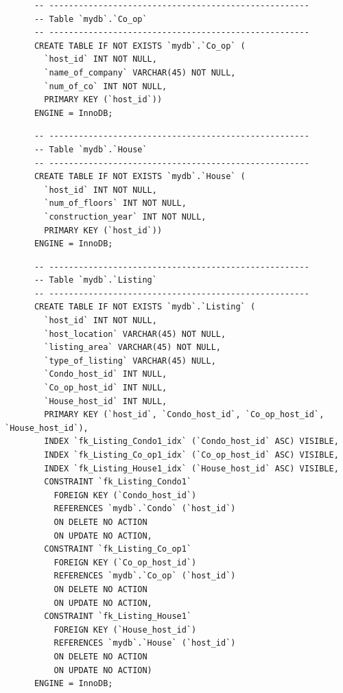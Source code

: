 \documentclass{report}
\begin{document}
    \begin{lstlisting}
      -- -----------------------------------------------------
      -- Table `mydb`.`Co_op`
      -- -----------------------------------------------------
      CREATE TABLE IF NOT EXISTS `mydb`.`Co_op` (
        `host_id` INT NOT NULL,
        `name_of_company` VARCHAR(45) NOT NULL,
        `num_of_co` INT NOT NULL,
        PRIMARY KEY (`host_id`))
      ENGINE = InnoDB;
    \end{lstlisting}


    \begin{lstlisting}
      -- -----------------------------------------------------
      -- Table `mydb`.`House`
      -- -----------------------------------------------------
      CREATE TABLE IF NOT EXISTS `mydb`.`House` (
        `host_id` INT NOT NULL,
        `num_of_floors` INT NOT NULL,
        `construction_year` INT NOT NULL,
        PRIMARY KEY (`host_id`))
      ENGINE = InnoDB;
    \end{lstlisting}


    \begin{lstlisting}
      -- -----------------------------------------------------
      -- Table `mydb`.`Listing`
      -- -----------------------------------------------------
      CREATE TABLE IF NOT EXISTS `mydb`.`Listing` (
        `host_id` INT NOT NULL,
        `host_location` VARCHAR(45) NOT NULL,
        `listing_area` VARCHAR(45) NOT NULL,
        `type_of_listing` VARCHAR(45) NULL,
        `Condo_host_id` INT NULL,
        `Co_op_host_id` INT NULL,
        `House_host_id` INT NULL,
        PRIMARY KEY (`host_id`, `Condo_host_id`, `Co_op_host_id`, `House_host_id`),
        INDEX `fk_Listing_Condo1_idx` (`Condo_host_id` ASC) VISIBLE,
        INDEX `fk_Listing_Co_op1_idx` (`Co_op_host_id` ASC) VISIBLE,
        INDEX `fk_Listing_House1_idx` (`House_host_id` ASC) VISIBLE,
        CONSTRAINT `fk_Listing_Condo1`
          FOREIGN KEY (`Condo_host_id`)
          REFERENCES `mydb`.`Condo` (`host_id`)
          ON DELETE NO ACTION
          ON UPDATE NO ACTION,
        CONSTRAINT `fk_Listing_Co_op1`
          FOREIGN KEY (`Co_op_host_id`)
          REFERENCES `mydb`.`Co_op` (`host_id`)
          ON DELETE NO ACTION
          ON UPDATE NO ACTION,
        CONSTRAINT `fk_Listing_House1`
          FOREIGN KEY (`House_host_id`)
          REFERENCES `mydb`.`House` (`host_id`)
          ON DELETE NO ACTION
          ON UPDATE NO ACTION)
      ENGINE = InnoDB;
    \end{lstlisting}
\end{document}
